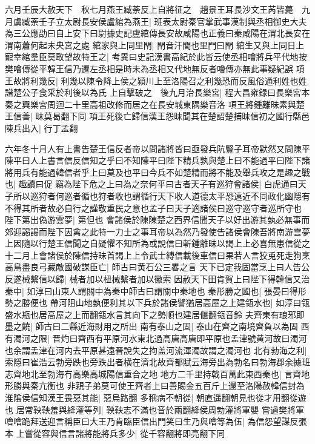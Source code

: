 六月壬辰大赦天下　秋七月燕王臧荼反上自將征之　趙景王耳長沙文王芮皆薨　九月虜臧荼壬子立太尉長安侯盧綰為燕王|{
	班表太尉秦官掌武事漢制與丞相御史大夫為三公應劭曰自上安下曰尉據史記盧綰傳長安故咸陽也正義曰秦咸陽在渭北長安在渭南蕭何起未央宮之處}
綰家與上同里閈|{
	閈音汗閭也里門曰閈}
綰生又與上同日上寵幸綰羣臣莫敢望故特王之|{
	考異曰史記漢書高紀於此皆云使丞相噲將兵平代地按樊噲傳從平韓王信乃遷左丞相是時未為丞相又代地無反者噲傳亦無此事疑紀誤}
項王故將利幾反|{
	利幾以陳令降上侯之潁川上至洛陽召之利幾恐而反風俗通利姓也姓譜楚公子食采於利後以為氏}
上自擊破之　後九月治長樂宮|{
	程大昌雍録曰長樂宮本秦之興樂宮周迴二十里高祖改修而居之在長安城東隅樂音洛}
項王將鍾離昧素與楚王信善|{
	昧莫曷翻下同}
項王死後亡歸信漢王怨昧聞其在楚詔楚捕昧信初之國行縣邑陳兵出入|{
	行丁孟翻}


六年冬十月人有上書告楚王信反者帝以問諸將皆曰亟發兵阬豎子耳帝默然又問陳平陳平曰人上書言信反信知之乎曰不知陳平曰陛下精兵孰與楚上曰不能過平曰陛下諸將用兵有能過韓信者乎上曰莫及也平曰今兵不如楚精而將不能及舉兵攻之是趣之戰也|{
	趣讀曰促}
竊為陛下危之上曰為之奈何平曰古者天子有巡狩會諸侯|{
	白虎通曰天子所以巡狩者何巡者循也狩者收也謂循行天下收人道德太平恐遠近不同政化幽隱有不得其所者故必自行之謹敬重民之意也孟子曰天子適諸侯曰巡守巡守者巡所守也}
陛下第出偽游雲夢|{
	第但也}
會諸侯於陳陳楚之西界信聞天子以好出游其埶必無事而郊迎謁謁而陛下因禽之此特一力士之事耳帝以為然乃發使告諸侯會陳吾將南游雲夢上因隨以行楚王信聞之自疑懼不知所為或說信曰斬鍾離昧以謁上上必喜無患信從之十二月上會諸侯於陳信持昧首謁上上令武士縛信載後車信曰果若人言狡兎死走狗烹高鳥盡良弓藏敵國破謀臣亡|{
	師古曰黄石公三畧之言}
天下已定我固當烹上曰人告公反遂械繫信以歸|{
	械者加以杻械繫者加以徽索}
因赦天下田肯賀上曰陛下得韓信又治秦中|{
	如淳曰山東人謂關中為秦中師古曰謂關中秦地也}
秦形勝之國也|{
	張晏曰得形勢之勝便也}
帶河阻山地埶便利其以下兵於諸侯譬猶居高屋之上建瓴水也|{
	如淳曰瓴盛水瓶也居高屋之上而翻瓴水言其向下之勢順也建居偃翻瓴音鈴}
夫齊東有琅邪即墨之饒|{
	師古曰二縣近海財用之所出}
南有泰山之固|{
	泰山在齊之南境齊負以為固}
西有濁河之限|{
	晋灼曰齊西有平原河水東北過高唐高唐即平原也孟津號黄河故曰濁河也余謂孟津在河内去平原甚遠晉說失之拘盖河流渾濁故謂之濁河也}
北有勃海之利|{
	索隱曰崔浩云勃旁跌也旁跌出者横在濟北故齊都賦云海旁出為勃名曰勃海郡余據班志齊地北至勃海冇高樂高城陽信重合之地}
地方二千里持戟百萬此東西秦也|{
	言齊地形勝與秦亢衡也}
非親子弟莫可使王齊者上曰善賜金五百斤上還至洛陽赦韓信封為淮隂侯信知漢王畏惡其能|{
	惡烏路翻}
多稱病不朝從|{
	朝直遥翻朝見也從才用翻從遊也}
居常鞅鞅羞與絳灌等列|{
	鞅鞅志不滿也音於兩翻絳侯周勃灌將軍嬰}
嘗過樊將軍噲噲跪拜送迎言稱臣曰大王乃肯臨臣信出門笑曰生乃與噲等為伍|{
	為信怨望謀反張本}
上嘗從容與信言諸將能將兵多少|{
	從千容翻將即亮翻下同}
